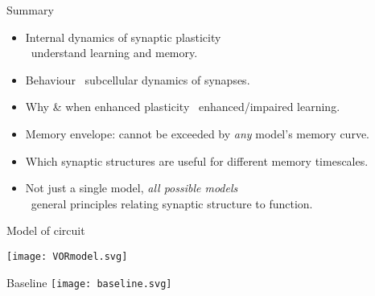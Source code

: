 \documentclass[final]{beamer}%
\begin{document}
\begin{frame}{Summary}
%
 \begin{itemize}
   \item Internal dynamics of synaptic plasticity \\ \hfill
   \lto\ understand learning and memory.

   \vp\item Behaviour \lto\ subcellular dynamics of synapses.

   \vp\item Why \& when enhanced plasticity \lto\ enhanced/impaired learning.

   \vp\item Memory envelope: cannot be exceeded by \emph{any} model's memory curve.

   \vp\item Which synaptic structures are useful for different memory timescales.

   \vp\item Not just a single model, \emph{all possible models} \\ \hfill
   \lto\ general principles relating synaptic structure to function.
 \end{itemize}
%
\end{frame}

\appendix


\begin{frame}{Model of circuit}
%
 \begin{center}
   \texttt{[image: VORmodel.svg]}
 \end{center}
%
\end{frame}


\begin{frame}{Baseline}
%
    \texttt{[image: baseline.svg]}

%
\end{frame}
\end{document}
